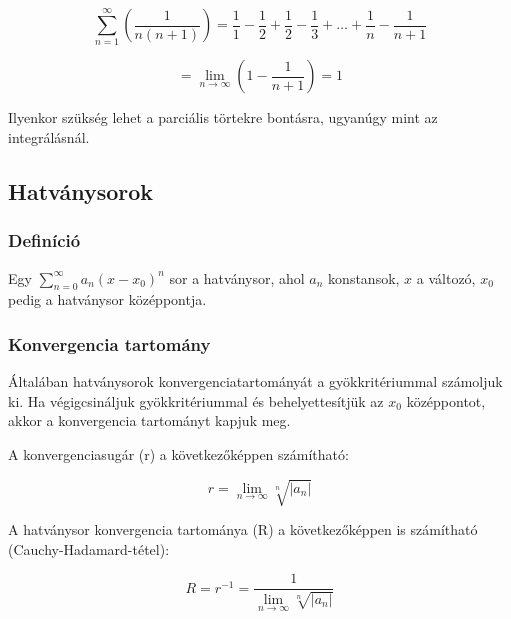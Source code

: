 \documentclass{article}
\begin{document}
\begin{equation*}
    \sum_{n=1}^{\infty} \left(\frac{1}{n(n+1)} \right) = \frac{1}{1} - \frac{1}{2}+ \frac{1}{2} - \frac{1}{3}  + \ldots +  \frac{1}{n} - \frac{1}{n+1}
\end{equation*}

\begin{equation*}
    = \lim_{n \to \infty} \left(1 - \frac{1}{n+1}\right) = 1
\end{equation*}


Ilyenkor szükség lehet a parciális törtekre bontásra, ugyanúgy mint az integrálásnál.

\newpage

\subsection{Hatványsorok}

\subsubsection{Definíció}

Egy $\sum_{n=0}^{\infty} a_n(x - x_0)^n$ sor a hatványsor, ahol $a_n$ konstansok, $x$ a változó, $x_0$ pedig a hatványsor középpontja.

\subsubsection{Konvergencia tartomány}

Általában hatványsorok konvergenciatartományát a gyök\-kri\-té\-ri\-um\-mal szá\-mol\-juk ki. Ha vé\-gig\-csi\-nál\-juk
gyökkritériummal és be\-he\-lyet\-te\-sít\-jük az $x_0$ kö\-zép\-pon\-tot, akkor a kon\-ver\-gen\-cia tartományt kapjuk meg.

A konvergenciasugár (r) a következőképpen számítható:

\begin{equation*}
    r = \lim_{n \to \infty} \sqrt[n]{\left\lvert a_n \right\rvert}
\end{equation*}

\vspace{4mm}

A hatványsor konvergencia tartománya (R) a következőképpen is számítható (Cauchy-Hadamard-tétel):

\begin{equation*}
    R = r^{-1} =\frac{1}{\lim_{n \to \infty} \sqrt[n]{\left\lvert a_n \right\rvert}}
\end{equation*}
\end{document}

